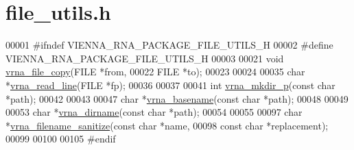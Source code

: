 \hypertarget{file__utils_8h_source}{}\section{file\+\_\+utils.\+h}
\label{file__utils_8h_source}

\begin{DoxyCode}
00001 \textcolor{preprocessor}{#ifndef VIENNA\_RNA\_PACKAGE\_FILE\_UTILS\_H}
00002 \textcolor{preprocessor}{#define VIENNA\_RNA\_PACKAGE\_FILE\_UTILS\_H}
00003 
00021 \textcolor{keywordtype}{void} \mbox{\hyperlink{group__file__utils_ga4382a56d2fee9ed738364b99329edc7c}{vrna\_file\_copy}}(FILE  *from,
00022                     FILE  *to);
00023 
00024 
00035 \textcolor{keywordtype}{char} *\mbox{\hyperlink{group__file__utils_gad16c270b70a77c753088b29de8a802dc}{vrna\_read\_line}}(FILE *fp);
00036 
00037 
00041 \textcolor{keywordtype}{int} \mbox{\hyperlink{group__file__utils_gacfa44a974272a4d42c5d391cc780a0ec}{vrna\_mkdir\_p}}(\textcolor{keyword}{const} \textcolor{keywordtype}{char} *path);
00042 
00043 
00047 \textcolor{keywordtype}{char} *\mbox{\hyperlink{group__file__utils_ga8d0f8f84f1e2628172cf3c8648b2e507}{vrna\_basename}}(\textcolor{keyword}{const} \textcolor{keywordtype}{char} *path);
00048 
00049 
00053 \textcolor{keywordtype}{char} *\mbox{\hyperlink{group__file__utils_gae006d31b088d52d8aace86948def5fe8}{vrna\_dirname}}(\textcolor{keyword}{const} \textcolor{keywordtype}{char} *path);
00054 
00055 
00097 \textcolor{keywordtype}{char} *\mbox{\hyperlink{group__file__utils_ga72eae0a472bad905b6facccf5b453a76}{vrna\_filename\_sanitize}}(\textcolor{keyword}{const} \textcolor{keywordtype}{char} *name,
00098                              \textcolor{keyword}{const} \textcolor{keywordtype}{char} *replacement);
00099 
00100 
00105 \textcolor{preprocessor}{#endif}
\end{DoxyCode}
